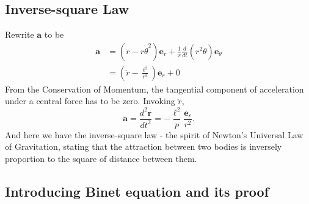 \documentclass{article}
\begin{document}
\subsection{Inverse-square Law}

Rewrite $\boldsymbol{a}$ to be
\begin{align*}
    \boldsymbol{a} & =(\ddot{r}-r \dot{\theta}^{2}) \boldsymbol{e}_{r}+\frac{1}{r} \frac{d}{dt} \left( r^2 \dot\theta \right) \boldsymbol{e}_{\theta}
\\ & = (\ddot r - \frac{\ell^2}{r^3}) \boldsymbol{e}_{r} + 0
\end{align*}
From the Conservation of Momentum, the tangential component of acceleration under a central force has to be zero. Invoking $\ddot r$,
\begin{equation*}
    \boldsymbol{a} = \frac{d^2 \boldsymbol{r}}{dt^2} = - \frac{\ell ^ 2}{p} \frac{\boldsymbol{e}_{r}}{r ^ 2}.
\end{equation*}
And here we have the inverse-square law - the spirit of Newton's Universal Law of Gravitation, stating that the attraction between two bodies is inversely proportion to the square of distance between them.

\subsection{Introducing Binet equation and its proof}
\end{document}
